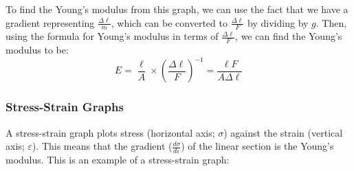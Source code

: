             To find the Young's modulus from this graph, we can use the fact that we have a gradient representing $\frac{\Delta\ell}{m}$, which can be converted to $\frac{\Delta\ell}{F}$ by dividing by $g$.
            Then, using the formula for Young's modulus in terms of $\frac{\Delta\ell}{F}$, we can find the Young's modulus to be:
            \begin{equation}
                E=\frac{\ell}{A}\times\left(\frac{\Delta\ell}{F}\right)^{-1}=\frac{\ell F}{A\Delta\ell}
            \end{equation}
                            
            \subsubsection{Stress-Strain Graphs}
                A stress-strain graph plots stress (horizontal axis; $\sigma$) against the strain (vertical axis; $\varepsilon$).
                This means that the gradient ($\frac{d\sigma}{d\varepsilon}$) of the linear section is the Young's modulus.
                This is an example of a stress-strain graph:
